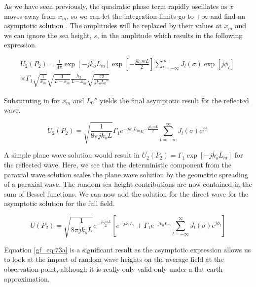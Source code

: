 As we have seen previously, the quadratic phase term rapidly oscillates as $x$ moves away from $x_m$, so we can let the integration limits go to $\pm \infty$ and find an asymptotic solution \cite{cheng_analytic_methods}. The amplitudes will be replaced by their values at $x_m$ and we can ignore the sea height, $s$, in the amplitude which results in the following expression.

\begin{equation}
\begin{gathered}
U_2(P_2) = \frac{1}{4\pi} \exp[-jk_oL_m] \exp\left[-\frac{jk_omL}{2}\right] \sum_{l=-\infty}^{\infty}J_l(\sigma)\exp\left[j\phi_l\right]\  \\
\times \Gamma_1 \sqrt{\frac{1}{x_m}}\sqrt{\frac{1}{L-x_m}}\frac{h_2}{L-x_m}\sqrt{\frac{\pi 2}{jk_oL_0''}}
\label{gf_eq:72}
\end{gathered}
\end{equation}
\renewcommand{\baselinestretch}{2} \small\normalsize

\noindent Substituting in for $x_m$ and $L_0''$ yields the final asymptotic result for the reflected wave.

\begin{equation}
U_2(P_2) = \sqrt{\frac{1}{8\pi jk_o L}}\Gamma_1e^{-jk_oL_m} e^{-\frac{jk_omL}{2}} \sum_{l=-\infty}^{\infty}J_l(\sigma)e^{j\phi_l}
\label{gf_eq:73}
\end{equation}
\renewcommand{\baselinestretch}{2} \small\normalsize

A simple plane wave solution would result in $U_2(P_2) = \Gamma_1\exp[-jk_oL_m]$ for the reflected wave. Here, we see that the deterministic component from the paraxial wave  solution scales the plane wave solution by the geometric spreading of a paraxial wave. The random sea height contributions are now contained in the sum of Bessel functions. We can now add the solution for the direct wave for the asymptotic solution for the full field.

\begin{equation}
\boxed{U(P_2) = \sqrt{\frac{1}{8\pi jk_o L}}e^{-\frac{jk_omL}{2}} \left[e^{-jk_oL_1}+\Gamma_1e^{-jk_oL_m} \sum_{l=-\infty}^{\infty}J_l(\sigma)e^{j\phi_l}\right]}
\label{gf_eq:73a}
\end{equation}
\renewcommand{\baselinestretch}{2} \small\normalsize

Equation \ref{gf_eq:73a} is a significant result as the asymptotic expression allows us to look at the impact of random wave heights on the average field at the observation point, although it is really only valid only under a flat earth approximation.

